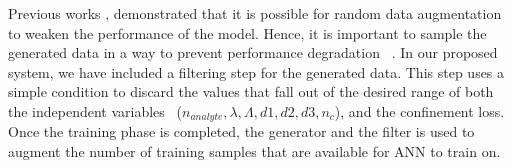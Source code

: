 \documentclass[journal]{IEEEtran}
\begin{document}
Previous works \cite{ravuri2019seeing, shmelkov2018good}, demonstrated that it is possible for random data augmentation to weaken the performance of the model. Hence, it is important to sample the generated data in a way to prevent performance degradation  \cite{bhattarai2019sampling}. In our proposed system, we have included a filtering step for the generated data. This step uses a simple condition to discard the values that fall out of the desired range of both the independent variables  ($n_{analyte}, \lambda, \Lambda, d1, d2, d3, n_c$), and the confinement loss. Once the training phase is completed, the generator and the filter is used to augment the number of training samples that are available for ANN to train on.
%
%	
\end{document}
